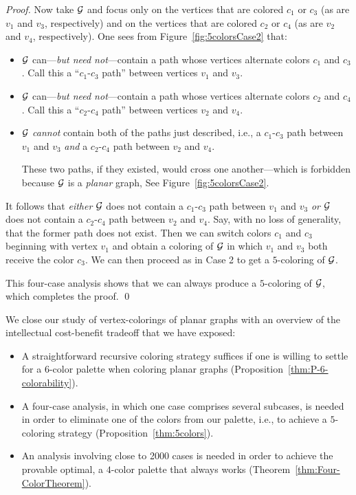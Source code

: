 \begin{proof}
Now take $\mbox{$\cal G$}$ and focus only on the vertices that are colored $c_1$ or $c_3$ (as are $v_1$ and $v_3$, respectively) and on the vertices that are colored $c_2$ or $c_4$ (as are $v_2$ and $v_4$, respectively).  One sees from Figure~\ref{fig:5colorsCase2} that:
\begin{itemize}
\item
$\mbox{$\cal G$}$ can---{\em but need not}---contain a path whose vertices alternate  colors $c_1$ and $c_3$. Call this a ``$c_1$-$c_3$ path'' between vertices $v_1$ and $v_3$.
\item
$\mbox{$\cal G$}$ can---{\em but need not}---contain a path whose vertices alternate colors $c_2$ and $c_4$.  Call this a ``$c_2$-$c_4$ path'' between vertices $v_2$ and $v_4$.
\item
$\mbox{$\cal G$}$ {\em cannot} contain both of the paths just described, i.e., a $c_1$-$c_3$ path between $v_1$ and $v_3$ {\em and} a $c_2$-$c_4$ path between $v_2$ and $v_4$.

\smallskip

These two paths, if they existed, would cross one another---which is forbidden because $\mbox{$\cal G$}$ is a {\em planar} graph,  See Figure~\ref{fig:5colorsCase2}.


\end{itemize}
It follows that {\em either} $\mbox{$\cal G$}$ does not contain a $c_1$-$c_3$ path between $v_1$ and $v_3$ {\em or} $\mbox{$\cal G$}$ does not contain a $c_2$-$c_4$ path between $v_2$ and $v_4$.  Say, with no loss of generality, that the former path does not exist.  Then we can switch colors $c_1$ and $c_3$ beginning with vertex $v_1$ and obtain a coloring of $\mbox{$\cal G$}$ in which $v_1$ and $v_3$ both receive the color $c_3$.  We can then proceed as in Case 2 to get a $5$-coloring of $\mbox{$\cal G$}$.

\smallskip

This four-case analysis shows that we can always produce a $5$-coloring of $\mbox{$\cal G$}$, which completes the proof.  \qed
\end{proof}

\bigskip

We close our study of vertex-colorings of planar graphs with an overview of the intellectual cost-benefit tradeoff that we have exposed:
\begin{itemize}
\item
A straightforward recursive coloring strategy suffices if one is willing to settle for a $6$-color palette when coloring planar graphs (Proposition~\ref{thm:P-6-colorability}).
\item
A four-case analysis, in which one case comprises several subcases, is needed in order to eliminate one of the colors from our palette, i.e., to achieve a $5$-coloring strategy (Proposition~\ref{thm:5colors}).
\item
An analysis involving close to 2000 cases is needed in order to achieve the provable optimal, a $4$-color palette that always works (Theorem~\ref{thm:Four-ColorTheorem}).
\end{itemize}

